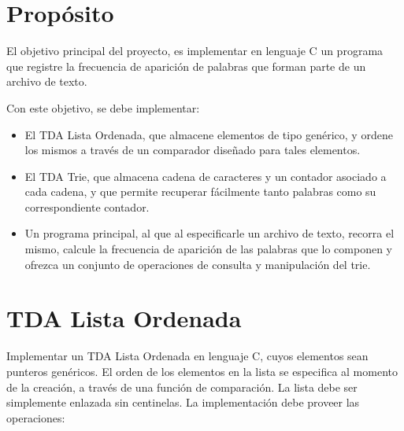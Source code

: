 \documentclass[12pt,a4paper]{article}
\begin{document}

\section*{Propósito}
El objetivo principal del proyecto, es implementar en lenguaje C un programa que registre la frecuencia de aparición de palabras que forman parte de un archivo de texto. 

Con este objetivo, se debe implementar:
\begin{itemize}
	
	\item El TDA Lista Ordenada, que almacene elementos de tipo genérico, y ordene los mismos a través de un comparador diseñado para tales elementos.
	
	\item El TDA Trie, que almacena cadena de caracteres y un contador asociado a cada cadena, y que permite recuperar fácilmente tanto palabras como su correspondiente contador.
	
	\item Un programa principal, al que al especificarle un archivo de texto, recorra el mismo, calcule la frecuencia de aparición de las palabras que lo componen y ofrezca un conjunto de operaciones de consulta y manipulación del trie.
	
\end{itemize}

\section{TDA Lista Ordenada}
Implementar un TDA Lista Ordenada en lenguaje C, cuyos elementos sean punteros genéricos. El orden de los elementos en la lista se especifica al momento de la creación, a través de una función de comparación. La lista debe ser simplemente enlazada sin centinelas. La implementación debe proveer las operaciones:
\end{document}
